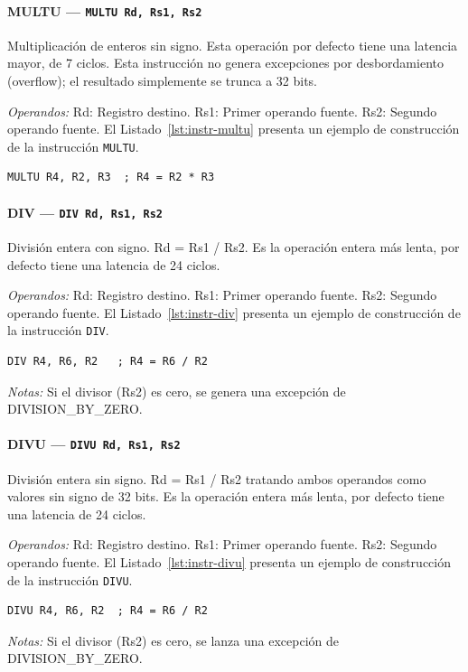 \documentclass[../main.tex]{subfiles}
\begin{document}
\paragraph*{MULTU --- \texttt{MULTU Rd, Rs1, Rs2}}
Multiplicación de enteros sin signo. Esta operación por defecto tiene una latencia mayor, de 7 ciclos. Esta instrucción no genera excepciones por desbordamiento (overflow); el resultado simplemente se trunca a 32 bits.

\textit{Operandos:} Rd: Registro destino. Rs1: Primer operando fuente. Rs2: Segundo operando fuente.
El Listado~\ref{lst:instr-multu} presenta un ejemplo de construcción de la instrucción \texttt{MULTU}.

\begin{lstlisting}[caption={MULTU},label={lst:instr-multu}]
	MULTU R4, R2, R3  ; R4 = R2 * R3
\end{lstlisting}

\paragraph*{DIV --- \texttt{DIV Rd, Rs1, Rs2}}
División entera con signo. Rd = Rs1 / Rs2. Es la operación entera más lenta, por defecto tiene una latencia de 24 ciclos.

\textit{Operandos:} Rd: Registro destino. Rs1: Primer operando fuente. Rs2: Segundo operando fuente.
El Listado~\ref{lst:instr-div} presenta un ejemplo de construcción de la instrucción \texttt{DIV}.

\begin{lstlisting}[caption={DIV},label={lst:instr-div}]
	DIV R4, R6, R2   ; R4 = R6 / R2
\end{lstlisting}
\textit{Notas:} Si el divisor (Rs2) es cero, se genera una excepción de DIVISION\_BY\_ZERO.

\paragraph*{DIVU --- \texttt{DIVU Rd, Rs1, Rs2}}
División entera sin signo. Rd = Rs1 / Rs2 tratando ambos operandos como valores sin signo de 32 bits. Es la operación entera más lenta, por defecto tiene una latencia de 24 ciclos.

\textit{Operandos:} Rd: Registro destino. Rs1: Primer operando fuente. Rs2: Segundo operando fuente.
El Listado~\ref{lst:instr-divu} presenta un ejemplo de construcción de la instrucción \texttt{DIVU}.

\begin{lstlisting}[caption={DIVU},label={lst:instr-divu}]
	DIVU R4, R6, R2  ; R4 = R6 / R2
\end{lstlisting}
\textit{Notas:} Si el divisor (Rs2) es cero, se lanza una excepción de DIVISION\_BY\_ZERO.
\end{document}
